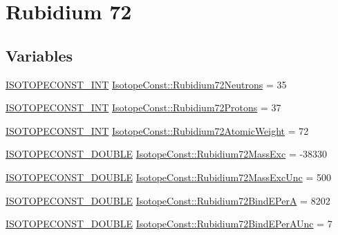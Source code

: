 \hypertarget{group___isotope_const-_rubidium-_rb72}{}\section{Rubidium 72}
\label{group___isotope_const-_rubidium-_rb72}
\subsection*{Variables}
\begin{DoxyCompactItemize}
\item 
\mbox{\hyperlink{group___isotope_const-_macros_ga5f18360b3e99483a35c32d789e62621c}{I\+S\+O\+T\+O\+P\+E\+C\+O\+N\+S\+T\+\_\+\+I\+NT}} \mbox{\hyperlink{group___isotope_const-_rubidium-_rb72_ga53dc187db2b5f9fd2dd40530c16d9fa7}{Isotope\+Const\+::\+Rubidium72\+Neutrons}} = 35
\item 
\mbox{\hyperlink{group___isotope_const-_macros_ga5f18360b3e99483a35c32d789e62621c}{I\+S\+O\+T\+O\+P\+E\+C\+O\+N\+S\+T\+\_\+\+I\+NT}} \mbox{\hyperlink{group___isotope_const-_rubidium-_rb72_gac2136038b1ba05dcbab9887fb0dc2128}{Isotope\+Const\+::\+Rubidium72\+Protons}} = 37
\item 
\mbox{\hyperlink{group___isotope_const-_macros_ga5f18360b3e99483a35c32d789e62621c}{I\+S\+O\+T\+O\+P\+E\+C\+O\+N\+S\+T\+\_\+\+I\+NT}} \mbox{\hyperlink{group___isotope_const-_rubidium-_rb72_ga0d11b369e7459e930cddd263f63181e5}{Isotope\+Const\+::\+Rubidium72\+Atomic\+Weight}} = 72
\item 
\mbox{\hyperlink{group___isotope_const-_macros_ga8f45a7272ce02c0b4c65c44636ed719a}{I\+S\+O\+T\+O\+P\+E\+C\+O\+N\+S\+T\+\_\+\+D\+O\+U\+B\+LE}} \mbox{\hyperlink{group___isotope_const-_rubidium-_rb72_ga8fa0fa4daa4508c0aa4ea74aff093835}{Isotope\+Const\+::\+Rubidium72\+Mass\+Exc}} = -\/38330
\item 
\mbox{\hyperlink{group___isotope_const-_macros_ga8f45a7272ce02c0b4c65c44636ed719a}{I\+S\+O\+T\+O\+P\+E\+C\+O\+N\+S\+T\+\_\+\+D\+O\+U\+B\+LE}} \mbox{\hyperlink{group___isotope_const-_rubidium-_rb72_ga6f414f5babbebd28bea8f30b6f0f7f62}{Isotope\+Const\+::\+Rubidium72\+Mass\+Exc\+Unc}} = 500
\item 
\mbox{\hyperlink{group___isotope_const-_macros_ga8f45a7272ce02c0b4c65c44636ed719a}{I\+S\+O\+T\+O\+P\+E\+C\+O\+N\+S\+T\+\_\+\+D\+O\+U\+B\+LE}} \mbox{\hyperlink{group___isotope_const-_rubidium-_rb72_gaa314b74c4088dca4372439289a3e6f37}{Isotope\+Const\+::\+Rubidium72\+Bind\+E\+PerA}} = 8202
\item 
\mbox{\hyperlink{group___isotope_const-_macros_ga8f45a7272ce02c0b4c65c44636ed719a}{I\+S\+O\+T\+O\+P\+E\+C\+O\+N\+S\+T\+\_\+\+D\+O\+U\+B\+LE}} \mbox{\hyperlink{group___isotope_const-_rubidium-_rb72_gae9213fb31fd63198e2a74011acbca8db}{Isotope\+Const\+::\+Rubidium72\+Bind\+E\+Per\+A\+Unc}} = 7

\end{DoxyCompactItemize}
